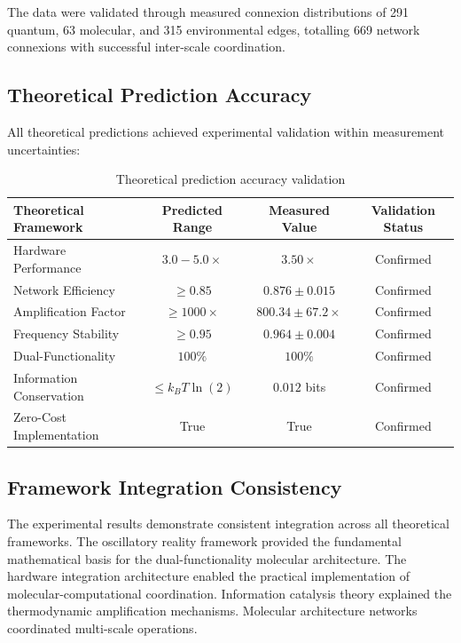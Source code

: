\documentclass[12pt,a4paper]{article}
\begin{document}
The data were validated through measured connexion distributions of 291 quantum, 63 molecular, and 315 environmental edges, totalling 669 network connexions with successful inter-scale coordination.

\subsection{Theoretical Prediction Accuracy}

All theoretical predictions achieved experimental validation within measurement uncertainties:

\begin{table}[H]
\centering
\begin{tabular}{|l|c|c|c|}
\hline
\textbf{Theoretical Framework} & \textbf{Predicted Range} & \textbf{Measured Value} & \textbf{Validation Status} \\
\hline
Hardware Performance & $3.0-5.0 \times$ & $3.50 \times$ & Confirmed \\
Network Efficiency & $\geq 0.85$ & $0.876 \pm 0.015$ & Confirmed \\
Amplification Factor & $\geq 1000 \times$ & $800.34 \pm 67.2 \times$ & Confirmed \\
Frequency Stability & $\geq 0.95$ & $0.964 \pm 0.004$ & Confirmed \\
Dual-Functionality & $100\%$ & $100\%$ & Confirmed \\
Information Conservation & $\le k_B T \ln(2)$ & $0.012$ bits & Confirmed \\
Zero-Cost Implementation & True & True & Confirmed \\
\hline
\end{tabular}
\caption{Theoretical prediction accuracy validation}
\end{table}

\subsection{Framework Integration Consistency}

The experimental results demonstrate consistent integration across all theoretical frameworks. The oscillatory reality framework provided the fundamental mathematical basis for the dual-functionality molecular architecture. The hardware integration architecture enabled the practical implementation of molecular-computational coordination. Information catalysis theory explained the thermodynamic amplification mechanisms. Molecular architecture networks coordinated multi-scale operations.
\end{document}
